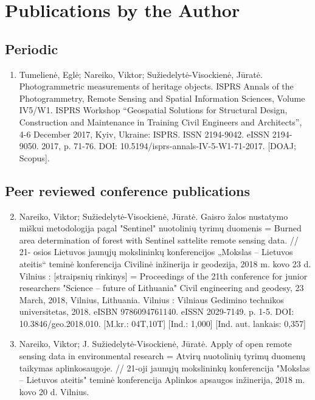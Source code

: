 	

\chapter*{Publications by the Author}
\label{cha:publications} 


\section*{Periodic}

\begin{enumerate}
\item Tumelienė, Eglė; Nareiko, Viktor; Sužiedelytė-Visockienė, Jūratė. Photogrammetric measurements of heritage objects. ISPRS Annals of the Photogrammetry, Remote Sensing and Spatial Information Sciences, Volume IV5/W1. ISPRS Workshop “Geospatial Solutions for Structural Design, Construction and Maintenance in Training Civil Engineers and Architects”, 4-6 December 2017, Kyiv, Ukraine: ISPRS. ISSN 2194-9042. eISSN 2194-9050. 2017, p. 71-76. DOI: 10.5194/isprs-annals-IV-5-W1-71-2017. [DOAJ; Scopus].
\end{enumerate}

\section*{Peer reviewed conference publications}
\begin{enumerate}
\setcounter{enumi}{1}
\item Nareiko, Viktor; Sužiedelytė-Visockienė, Jūratė. Gaisro žalos nustatymo miškui metodologija pagal "Sentinel" nuotolinių tyrimų duomenis = Burned area determination of forest with Sentinel sattelite remote sensing data. // 21- osios Lietuvos jaunųjų mokslininkų konferencijos „Mokslas – Lietuvos ateitis“ teminė konferencija Civilinė inžinerija ir geodezija, 2018 m. kovo 23 d. Vilnius : [straipsnių rinkinys] = Proceedings of the 21th conference for junior researchers "Science – future of Lithuania" Civil engineering and geodesy, 23 March, 2018, Vilnius, Lithuania. Vilnius : Vilniaus Gedimino technikos universitetas, 2018. eISBN 9786094761140. eISSN 2029-7149. p. 1-5. DOI: 10.3846/geo.2018.010. [M.kr.: 04T,10T] [Ind.: 1,000] [Ind. aut. lankais: 0,357]
\item Nareiko, Viktor; J. Sužiedelytė-Visockienė, Jūratė. Apply of open remote sensing data in environmental research = Atvirų nuotolinių tyrimų duomenų taikymas aplinkosaugoje. // 21-oji jaunųjų mokslininkų konferencija "Mokslas – Lietuvos ateitis" teminė konferencija Aplinkos apsaugos inžinerija, 2018 m. kovo 20 d. Vilnius.
\end{enumerate}